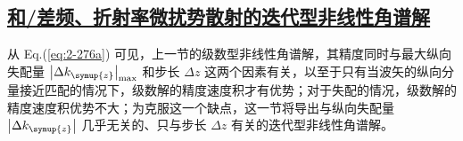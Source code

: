 \subsection{\protect\hyperlink{chap:\thesubsection}{和/差频、折射率微扰势散射的迭代型非线性角谱解}}
\label{和/差频、折射率微扰势散射的迭代型非线性角谱解}

从 Eq.(\ref{eq:2-276a}) 可见，上一节的级数型非线性角谱解，其精度同时与最大纵向失配量 $\left|\Delta k_{\symup{z}}\right|_{\max}$ 和步长 $\Delta z$ 这两个因素有关，以至于只有当波矢的纵向分量接近匹配的情况下，级数解的精度速度积才有优势；对于失配的情况，级数解的精度速度积优势不大；为克服这一个缺点，这一节将导出与纵向失配量 $\left|\Delta k_{\symup{z}}\right|$ 几乎无关的、只与步长 $\Delta z$ 有关的迭代型非线性角谱解。

